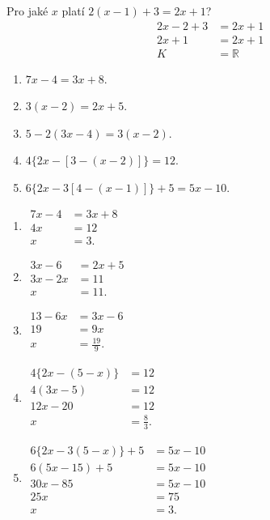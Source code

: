 \documentclass[11pt,a4paper]{article}
\begin{document}
\begin{zadaniReseniBox}[title={Úloha 1}]
Pro jaké $x$ platí $2(x-1)+3=2x+1$?
\tcblower
\begin{align*}
2x-2+3&=2x+1 \\
 2x+1&=2x+1 \\
 K&=\mathbb R
\end{align*}
\end{zadaniReseniBox}
\begin{zadaniReseniBox}
\begin{enumerate}[label=\alph*)]
\item $7x-4=3x+8$.
\item $3(x-2)=2x+5$.
\item $5-2(3x-4)=3(x-2)$.
\item $4\{2x-[3-(x-2)]\}=12$.
\item $6\{2x-3[4-(x-1)]\}+5=5x-10$.
\end{enumerate}
\tcblower
\begin{enumerate}[label=\alph*)]
\item \(\begin{aligned}7x-4&=3x+8\\4x&=12\\x&=3.\end{aligned}\)
\item \(\begin{aligned}3x-6&=2x+5\\3x-2x&=11\\x&=11.\end{aligned}\)
\item \(\begin{aligned}13-6x&=3x-6\\19&=9x\\x&=\tfrac{19}{9}.\end{aligned}\)
\item \(\begin{aligned}4\{2x-(5-x)\}&=12\\4(3x-5)&=12\\12x-20&=12\\x&=\tfrac83.\end{aligned}\)
\item \(\begin{aligned}6\{2x-3(5-x)\}+5&=5x-10\\6(5x-15)+5&=5x-10\\30x-85&=5x-10\\25x&=75\\x&=3.\end{aligned}\)
\end{enumerate}
\end{zadaniReseniBox}
\end{document}

